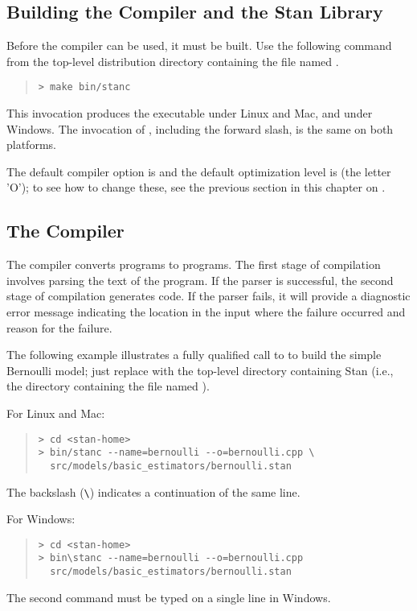 \subsection{Building the \stanc Compiler and the Stan Library}

Before the \stanc compiler can be used, it must be built.  Use the
following command from the top-level distribution directory containing
the file named .
%
\begin{quote}
\begin{Verbatim}[fontshape=sl]
> make bin/stanc
\end{Verbatim}
\end{quote}
%
This invocation produces the executable  under Linux
and Mac, and  under Windows.  The invocation of
, including the forward slash, is the same on both platforms.

The default compiler option is  and the default
optimization level is  (the letter 'O');  to see how to
change these, see the previous section in this chapter on .


\subsection{The \stanc Compiler}

The \stanc compiler converts \Stan programs to \Cpp programs.  The
first stage of compilation involves parsing the text of the \Stan
program.  If the parser is successful, the second stage of compilation
generates \Cpp code.  If the parser fails, it will provide a
diagnostic error message indicating the location in the input where
the failure occurred and reason for the failure.

The following example illustrates a fully qualified call to \stanc
to build the simple Bernoulli model; just replace 
with the top-level directory containing Stan (i.e., the directory
containing the file named ). 

For Linux and Mac:
%
\begin{quote}
\begin{Verbatim}[fontshape=sl]
> cd <stan-home>
> bin/stanc --name=bernoulli --o=bernoulli.cpp \
  src/models/basic_estimators/bernoulli.stan 
\end{Verbatim}
\end{quote}
%
The backslash (\Verb|\|) indicates a continuation of the same line.

For Windows:
%
\begin{quote}
\begin{Verbatim}[fontshape=sl]
> cd <stan-home>
> bin\stanc --name=bernoulli --o=bernoulli.cpp
  src/models/basic_estimators/bernoulli.stan 
\end{Verbatim}
\end{quote}
%
The second command must be typed on a single line in Windows. 


